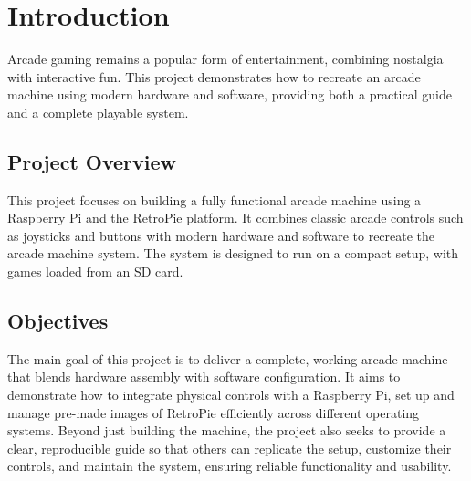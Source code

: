 \chapter{Introduction}
\label{cha:introduction}

Arcade gaming remains a popular form of entertainment, combining nostalgia with interactive fun. This project demonstrates how to recreate an arcade machine using modern hardware and software, providing both a practical guide and a complete playable system.

\section{Project Overview}
\label{sec:project_overview}

This project focuses on building a fully functional arcade machine using a Raspberry Pi and the RetroPie platform. It combines classic arcade controls such as joysticks and buttons with modern hardware and software to recreate the arcade machine system. The system is designed to run on a compact setup, with games loaded from an SD card. 

\section{Objectives}
\label{sec:objectives}

The main goal of this project is to deliver a complete, working arcade machine that blends hardware assembly with software configuration. It aims to demonstrate how to integrate physical controls with a Raspberry Pi, set up and manage pre-made images of RetroPie efficiently across different operating systems. Beyond just building the machine, the project also seeks to provide a clear, reproducible guide so that others can replicate the setup, customize their controls, and maintain the system, ensuring reliable functionality and usability.

